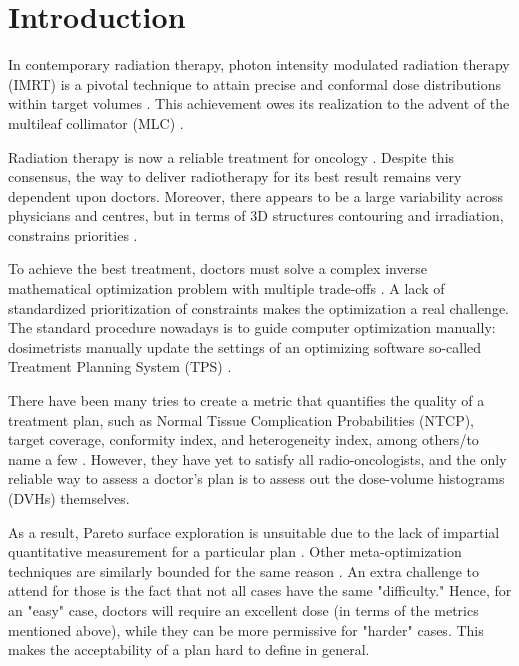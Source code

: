 \section{Introduction}
In contemporary radiation therapy, photon intensity modulated radiation therapy (IMRT) is a pivotal technique to attain precise and conformal dose distributions within target volumes \cite{xu_comparison_2017}.
This achievement owes its realization to the advent of the multileaf collimator (MLC) \cite{galvin_characterization_1993}.

Radiation therapy is now a reliable treatment for oncology \cite{valentini_survival_2009}.
Despite this consensus, the way to deliver radiotherapy for its best result remains very dependent upon doctors.
Moreover, there appears to be a large variability across physicians and centres, but in terms of 3D structures contouring and irradiation, constrains priorities \cite{variability_2021}.

To achieve the best treatment, doctors must solve a complex inverse mathematical optimization problem with multiple trade-offs \cite{oelfke_inverse_2001} \cite{webb_physical_2003}.
A lack of standardized prioritization of constraints makes the optimization a real challenge.
The standard procedure nowadays is to guide computer optimization manually: dosimetrists manually update the settings of an optimizing software so-called Treatment Planning System (TPS) \cite{planification_website}.

There have been many tries to create a metric that quantifies the quality of a treatment plan, such as Normal Tissue Complication Probabilities (NTCP), target coverage, conformity index, and heterogeneity index, among others/to name a few \cite{lyman_normal_1992} \cite{li_input_2022}\label{metrics}.
However, they have yet to satisfy all radio-oncologists, and the only reliable way to assess a doctor's plan is to assess out the dose-volume histograms (DVHs) themselves.

As a result, Pareto surface exploration is unsuitable due to the lack of impartial quantitative measurement for a particular plan \cite{huang_pareto_2021}.
Other meta-optimization techniques are similarly bounded for the same reason \cite{wu_optimization_2001} \cite{xing_optimization_1999}.
An extra challenge to attend for those is the fact that not all cases have the same "difficulty."
Hence, for an "easy" case, doctors will require an excellent dose (in terms of the metrics mentioned above), while they can be more permissive for "harder" cases.
This makes the acceptability of a plan hard to define in general.

